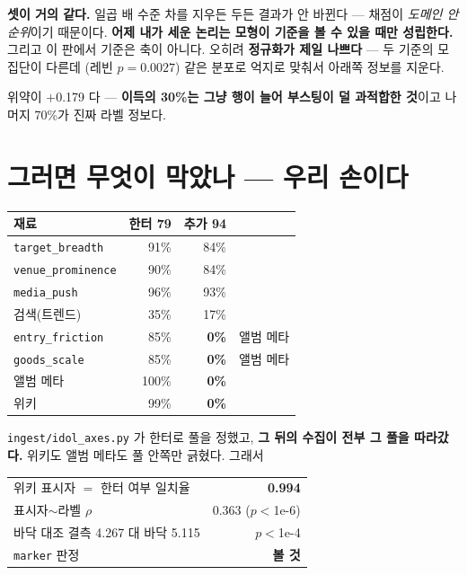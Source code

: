 \documentclass[10pt]{article}
\begin{document}
\textbf{셋이 거의 같다.} 일곱 배 수준 차를 지우든 두든 결과가 안 바뀐다 ---
채점이 \emph{도메인 안 순위}이기 때문이다. \textbf{어제 내가 세운 논리는
모형이 기준을 볼 수 있을 때만 성립한다.} 그리고 이 판에서 기준은 축이
아니다. 오히려 \textbf{정규화가 제일 나쁘다} --- 두 기준의 모집단이 다른데
(레빈 $p{=}0.0027$) 같은 분포로 억지로 맞춰서 아래쪽 정보를 지운다.

위약이 $+$0.179 다 --- \textbf{이득의 30\%는 그냥 행이 늘어 부스팅이 덜
과적합한 것}이고 나머지 70\%가 진짜 라벨 정보다.

\section{그러면 무엇이 막았나 --- 우리 손이다}

\begin{center}\footnotesize
\begin{tabular}{lrrl}
\hline
재료 & 한터 79 & 추가 94 & \\
\hline
\texttt{target\_breadth} & 91\% & 84\% & \\
\texttt{venue\_prominence} & 90\% & 84\% & \\
\texttt{media\_push} & 96\% & 93\% & \\
검색(트렌드) & 35\% & 17\% & \\
\hline
\texttt{entry\_friction} & 85\% & \textbf{0\%} & 앨범 메타 \\
\texttt{goods\_scale} & 85\% & \textbf{0\%} & 앨범 메타 \\
앨범 메타 & 100\% & \textbf{0\%} & \\
위키 & 99\% & \textbf{0\%} & \\
\hline
\end{tabular}
\end{center}

\texttt{ingest/idol\_axes.py} 가 한터로 풀을 정했고, \textbf{그 뒤의 수집이
전부 그 풀을 따라갔다.} 위키도 앨범 메타도 풀 안쪽만 긁혔다. 그래서

\begin{center}\small
\begin{tabular}{lr}
\hline
위키 표시자 $=$ 한터 여부 일치율 & \textbf{0.994} \\
표시자$\sim$라벨 $\rho$ & 0.363 ($p{<}$1e-6) \\
바닥 대조 결측 4.267 대 바닥 5.115 & $p{<}$1e-4 \\
\texttt{marker} 판정 & \textbf{볼 것} \\
\hline
\end{tabular}
\end{center}
\end{document}

